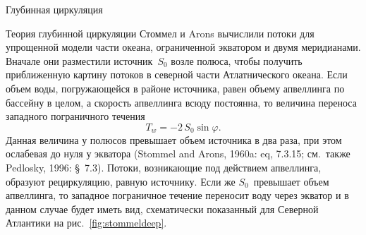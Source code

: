 \begin{chapter}{Глубинная циркуляция}
\begin{section}{Теория глубинной циркуляции}
Стоммел и Arons вычислили потоки для упрощенной модели части океана, 
ограниченной экватором и двумя меридианами. 
Вначале они разместили источник~$S_0$ возле полюса, чтобы получить
приближенную картину потоков в северной части Атлатнического океана.
Если объем воды, погружающейся в районе источника, равен объему апвеллинга
по бассейну в целом, а скорость апвеллинга всюду постоянна, то величина
переноса западного
пограничного течения
\begin{equation}
 T_w = -2\,S_0 \sin \varphi.
\end{equation}
Данная величина у полюсов превышает объем источника в два раза, 
при этом ослабевая до нуля у экватора (Stommel and Arons, 1960a: eq, 7.3.15; 
см.\ также Pedlosky, 1996: \S~7.3). Потоки, возникающие под действием
апвеллинга, образуют рециркуляцию,
равную источнику. Если же $S_0$~превышает объем апвеллинга, то западное 
пограничное течение переносит воду через экватор и в данном случае будет
иметь вид, схематически показанный для Северной Атлантики на 
рис.~\ref{fig:stommeldeep}.
%


\end{section}
\end{chapter}
